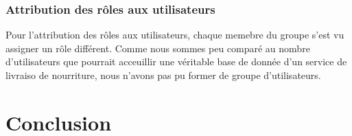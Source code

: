 \documentclass[french]{article}
\begin{document}
            \subsubsection*{Attribution des rôles aux utilisateurs}
                Pour l'attribution des rôles aux utilisateurs, chaque memebre du groupe s'est vu assigner un rôle différent. Comme nous sommes peu comparé au nombre d'utilisateurs que pourrait acceuillir une véritable base de donnée d'un service de livraiso de nourriture, nous n'avons pas pu former de groupe d'utilisateurs.

    \section{Conclusion}
        
\end{document}
